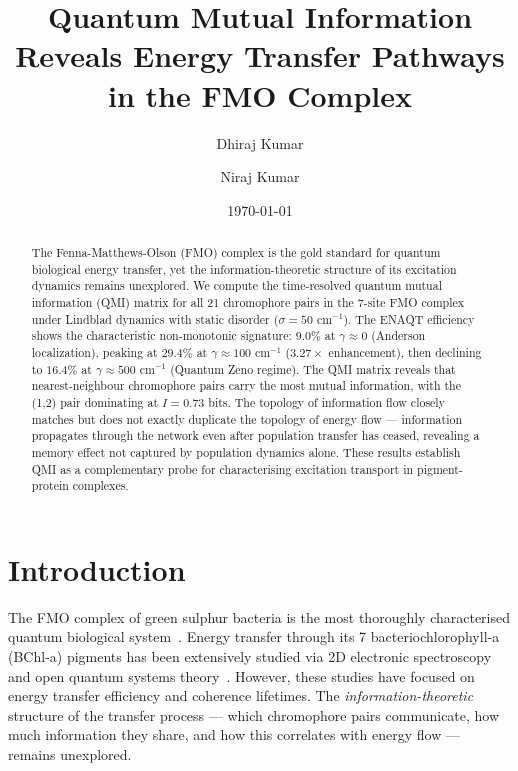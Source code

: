 \documentclass[aps,jcp,twocolumn,showpacs,superscriptaddress]{revtex4-2}
\begin{document}
\title{Quantum Mutual Information Reveals Energy Transfer Pathways in the FMO Complex}

\author{Dhiraj Kumar}
\author{Niraj Kumar}
\affiliation{}

\date{\today}

\begin{abstract}
The Fenna-Matthews-Olson (FMO) complex is the gold standard for quantum biological energy transfer, yet the information-theoretic structure of its excitation dynamics remains unexplored. We compute the time-resolved quantum mutual information (QMI) matrix for all 21 chromophore pairs in the 7-site FMO complex under Lindblad dynamics with static disorder ($\sigma = 50$ cm$^{-1}$). The ENAQT efficiency shows the characteristic non-monotonic signature: $9.0\%$ at $\gamma \approx 0$ (Anderson localization), peaking at $29.4\%$ at $\gamma \approx 100$ cm$^{-1}$ ($3.27\times$ enhancement), then declining to $16.4\%$ at $\gamma \approx 500$ cm$^{-1}$ (Quantum Zeno regime). The QMI matrix reveals that nearest-neighbour chromophore pairs carry the most mutual information, with the (1,2) pair dominating at $I = 0.73$ bits. The topology of information flow closely matches but does not exactly duplicate the topology of energy flow --- information propagates through the network even after population transfer has ceased, revealing a memory effect not captured by population dynamics alone. These results establish QMI as a complementary probe for characterising excitation transport in pigment-protein complexes.
\end{abstract}

\maketitle

\section{Introduction}

The FMO complex of green sulphur bacteria is the most thoroughly characterised quantum biological system~\cite{Adolphs2006}. Energy transfer through its 7 bacteriochlorophyll-a (BChl-a) pigments has been extensively studied via 2D electronic spectroscopy~\cite{Engel2007} and open quantum systems theory~\cite{Mohseni2008, Ishizaki2009}. However, these studies have focused on energy transfer efficiency and coherence lifetimes. The \emph{information-theoretic} structure of the transfer process --- which chromophore pairs communicate, how much information they share, and how this correlates with energy flow --- remains unexplored.
\end{document}
